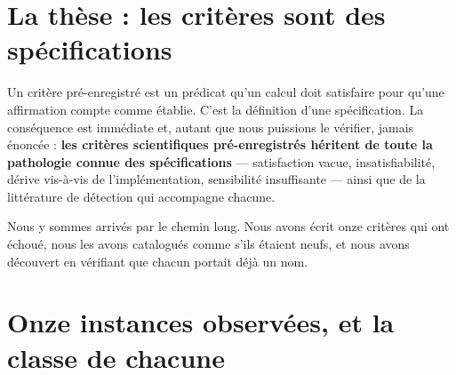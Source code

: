 \documentclass[11pt,a4paper]{article}
\begin{document}
\section{La thèse : les critères sont des spécifications}
\label{sec:these}

Un critère pré-enregistré est un prédicat qu'un calcul doit satisfaire pour qu'une
affirmation compte comme établie. C'est la définition d'une spécification. La conséquence est
immédiate et, autant que nous puissions le vérifier, jamais énoncée : \textbf{les critères
scientifiques pré-enregistrés héritent de toute la pathologie connue des spécifications} ---
satisfaction vacue, insatisfiabilité, dérive vis-à-vis de l'implémentation, sensibilité
insuffisante --- ainsi que de la littérature de détection qui accompagne chacune.

Nous y sommes arrivés par le chemin long. Nous avons écrit onze critères qui ont échoué, nous
les avons catalogués comme s'ils étaient neufs, et nous avons découvert en vérifiant que
chacun portait déjà un nom.

\section{Onze instances observées, et la classe de chacune}
\label{sec:mapping}
\end{document}
